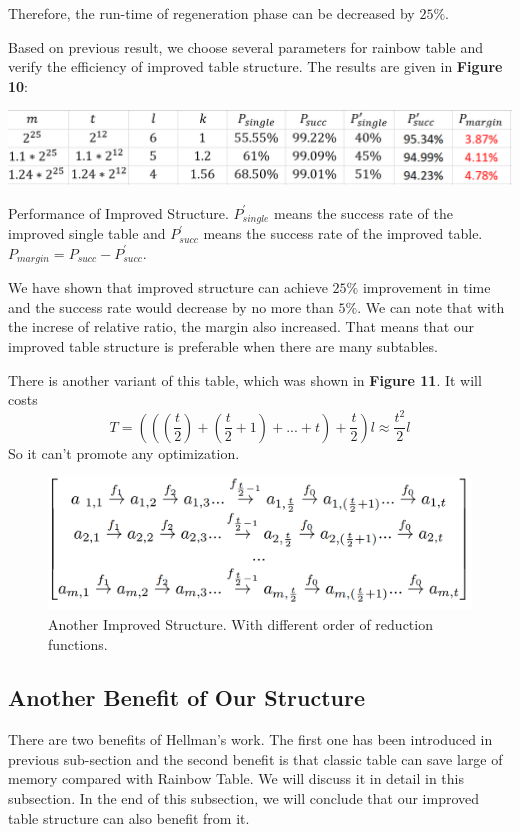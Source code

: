 \documentclass[runningheads,a4paper]{llncs}
\begin{document}
Therefore, the run-time of regeneration phase can be decreased by $25\%$.

Based on previous result, we choose several parameters for rainbow table and verify the efficiency of improved table structure. The results are given in \textbf{Figure 10}:

\begin{table}
\includegraphics[width=\linewidth]{table3}
\caption{Performance of Improved Structure. $P_{single}^{'}$ means the success rate of the improved single table and $P_{succ}^{'}$ means the success rate of the improved table. $P_{margin} = P_{succ} - P_{succ}^{'}$.}
\end{table}
We have shown that improved structure can achieve $25\%$ improvement in time and the success rate would decrease by no more than $5\%$. We can note that with the increse of relative ratio, the margin also increased. That means that our improved table structure is preferable when there are many subtables. 

There is another variant of this table, which was shown in \textbf{Figure 11}. It will costs 
$$T = (((\frac{t}{2}) + (\frac{t}{2}+1) + ... + t) + \frac{t}{2}) l\approx \frac{t^2}{2} l$$ 
So it can't promote any optimization.

\begin{figure}
\includegraphics[width=\linewidth]{graph8}
\caption{Another Improved Structure. With different order of reduction functions.}
\end{figure}

\subsection{Another Benefit of Our Structure}

There are two benefits of Hellman's work. The first one has been introduced in previous sub-section and the second benefit is that classic table can save large of memory compared with Rainbow Table. We will discuss it in detail in this subsection. In the end of this subsection, we will conclude that our improved table structure can also benefit from it.
\end{document}
